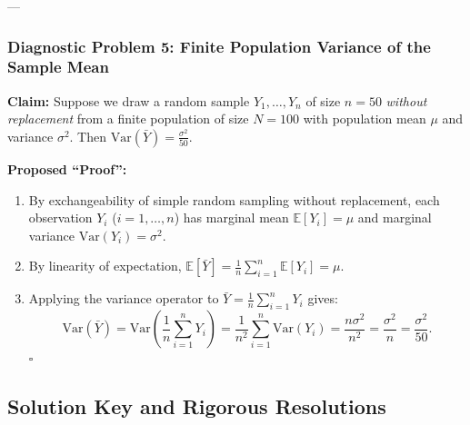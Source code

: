 \documentclass[11pt, letterpaper]{article}
\theoremstyle{definition}
\theoremstyle{remark}
\newcommand{\E}{\mathbb{E}}
\begin{document}
---

\subsubsection*{Diagnostic Problem 5: Finite Population Variance of the Sample Mean}
\textbf{Claim:} Suppose we draw a random sample $Y_1, \dots, Y_n$ of size $n = 50$ \emph{without replacement} from a finite population of size $N = 100$ with population mean $\mu$ and variance $\sigma^2$. Then $\text{Var}(\bar{Y}) = \frac{\sigma^2}{50}$.

\textbf{Proposed ``Proof'':}
\begin{enumerate}[label=\textbf{Line \arabic*:}]
    \item By exchangeability of simple random sampling without replacement, each observation $Y_i$ ($i = 1, \dots, n$) has marginal mean $\E[Y_i] = \mu$ and marginal variance $\text{Var}(Y_i) = \sigma^2$.
    \item By linearity of expectation, $\E[\bar{Y}] = \frac{1}{n}\sum_{i=1}^n \E[Y_i] = \mu$.
    \item Applying the variance operator to $\bar{Y} = \frac{1}{n}\sum_{i=1}^n Y_i$ gives:
    \[
        \text{Var}(\bar{Y}) = \text{Var}\left(\frac{1}{n}\sum_{i=1}^{n} Y_i\right) = \frac{1}{n^2} \sum_{i=1}^{n} \text{Var}(Y_i) = \frac{n\sigma^2}{n^2} = \frac{\sigma^2}{n} = \frac{\sigma^2}{50}.
    \]
    \hfill $\square$
\end{enumerate}

\newpage

\subsection{Solution Key and Rigorous Resolutions}
\end{document}
